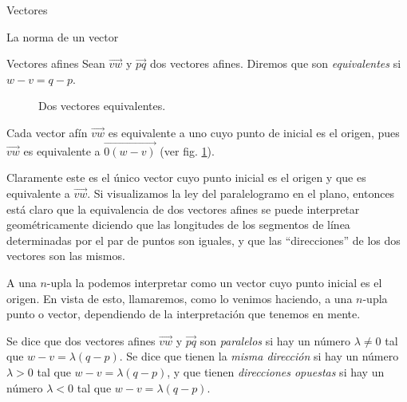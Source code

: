 \documentclass[a4paper,12pt,twoside,spanish]{amsbook}
\theoremstyle{definition}
\theoremstyle{remark}
\begin{document}
\begin{chapter}{Vectores}
\begin{section}{La norma de un vector}
\begin{section}{Vectores afines}
		Sean $\overrightarrow{vw}$ y $\overrightarrow{pq}$ dos vectores afines. Diremos que son \textit{equivalentes} si $w-v= q-p$. 
		\begin{figure}[h]
			\caption{Dos vectores equivalentes.}
			\label{fig-vectores-equivalerntes}
		\end{figure}
		
		Cada vector afín $\overrightarrow{vw}$ es equivalente a uno cuyo punto de inicial es el origen, pues $\overrightarrow{vw}$ es equivalente a $\overrightarrow{0(w-v)}$ (ver fig. \ref{fig-vectores-equivalerntes}).
		
		Claramente este es el único vector cuyo punto inicial es el origen y que es equivalente a $\overrightarrow{vw}$. Si visualizamos la ley del paralelogramo en el plano, entonces está claro que la equivalencia de dos vectores afines se puede interpretar geométricamente diciendo que las longitudes de los segmentos de línea determinadas por el par de puntos son iguales, y que las ``direcciones'' de los dos vectores son las mismos. 
		
		A una $n$-upla  la podemos interpretar como un  vector cuyo punto inicial es el origen. En vista de esto, llamaremos, como lo venimos haciendo,  a una $n$-upla punto o vector, dependiendo de la interpretación que tenemos en mente.
		
		Se dice que dos vectores afines $\overrightarrow{vw}$ y $\overrightarrow{pq}$ son \textit{paralelos} si hay un 	número $\lambda\ne 0$  tal que $w-v= \lambda(q-p)$. Se dice que tienen la \textit{misma dirección} si hay un número $\lambda >0$ tal que $w-v= \lambda(q-p)$, y que tienen \textit{direcciones opuestas} si hay un número $\lambda <0$ tal que $w-v= \lambda(q-p)$.
		

\end{section}
\end{section}
\end{chapter}
\end{document}
